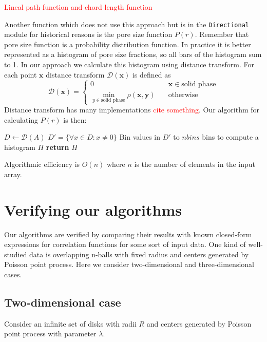 \documentclass[reprint,amsmath,amssymb,aps,pre,showkeys,showpacs,nofootinbib]{revtex4-1}
\newcommand{\code}[1]{\colorbox{light-gray}{\texttt{#1}}}
\begin{document}
\textcolor{red}{Lineal path function and chord length function}

Another function which does not use this approach but is in the
\code{Directional} module for historical reasons is the pore size function
$P(r)$. Remember that pore size function is a probability distribution
function. In practice it is better represented as a histogram of pore size
fractions, so all bars of the histogram sum to 1. In our approach we calculate
this histogram using distance transform. For each point $\bm{x}$ distance
transform $\mathcal{D}(\bm{x})$ is defined as
\begin{equation*}
  \mathcal{D}(\bm{x})= \left\{
  \begin{array}{ll}
    0 & \quad \bm{x} \in \text{solid phase} \\
    \min\limits_{y \in \text{solid phase}} \rho(\bm{x},\bm{y}) & \quad \text{otherwise}
  \end{array}
\right.
\end{equation*}
Distance transform has many implementations \textcolor{red}{cite something}. Our
algorithm for calculating $P(r)$ is then:
\begin{algorithmic}[1]
    \State $D \gets \mathcal{D}(A)$ 
    \State $D' = \{\forall x \in D: x \ne 0\}$
    \State Bin values in $D'$ to $nbins$ bins to compute a histogram $H$
    \State \textbf{return} $H$
  \EndProcedure
\end{algorithmic}
Algorithmic efficiency is $O(n)$ where $n$ is the number of elements in the
input array.

\section{Verifying our algorithms}
\label{sec:verification}
Our algorithms are verified by comparing their results with known closed-form
expressions for correlation functions for some sort of input data. One kind of
well-studied data is overlapping n-balls with fixed radius and centers generated
by Poisson point process. Here we consider two-dimensional and three-dimensional
cases.

\subsection{Two-dimensional case}
Consider an infinite set of disks with radii $R$ and centers generated by
Poisson point process with parameter $\lambda$.
\end{document}
